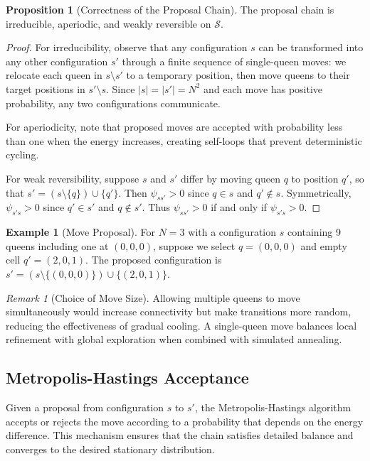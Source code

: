 \documentclass[10pt,twocolumn,a4paper]{article}
\newcommand{\statespace}{\mathcal{S}}
\theoremstyle{definition}
\newtheorem{example}{Example}[section]
\newtheorem{proposition}{Proposition}[section]
\theoremstyle{remark}
\newtheorem{remark}{Remark}[section]
\begin{document}
\begin{proposition}[Correctness of the Proposal Chain]
The proposal chain is irreducible, aperiodic, and weakly reversible on $\statespace$.
\end{proposition}
\begin{proof}
For irreducibility, observe that any configuration $s$ can be transformed into any other configuration $s'$ through a finite sequence of single-queen moves: we relocate each queen in $s\setminus s'$ to a temporary position, then move queens to their target positions in $s'\setminus s$. Since $|s|=|s'|=N^2$ and each move has positive probability, any two configurations communicate.

For aperiodicity, note that proposed moves are accepted with probability less than one when the energy increases, creating self-loops that prevent deterministic cycling.

For weak reversibility, suppose $s$ and $s'$ differ by moving queen $q$ to position $q'$, so that $s'=(s\setminus\{q\})\cup\{q'\}$. Then $\psi_{ss'}>0$ since $q\in s$ and $q'\notin s$. Symmetrically, $\psi_{s's}>0$ since $q'\in s'$ and $q\notin s'$. Thus $\psi_{ss'}>0$ if and only if $\psi_{s's}>0$.
\end{proof}

\begin{example}[Move Proposal]
For $N=3$ with a configuration $s$ containing 9 queens including one at $(0,0,0)$, suppose we select $q=(0,0,0)$ and empty cell $q'=(2,0,1)$. The proposed configuration is $s'=(s\setminus\{(0,0,0)\})\cup\{(2,0,1)\}$.
\end{example}

\begin{remark}[Choice of Move Size]
Allowing multiple queens to move simultaneously would increase connectivity but make transitions more random, reducing the effectiveness of gradual cooling. A single-queen move balances local refinement with global exploration when combined with simulated annealing.
\end{remark}

\subsection{Metropolis-Hastings Acceptance}
Given a proposal from configuration $s$ to $s'$, the Metropolis-Hastings algorithm accepts or rejects the move according to a probability that depends on the energy difference. This mechanism ensures that the chain satisfies detailed balance and converges to the desired stationary distribution.
\end{document}
